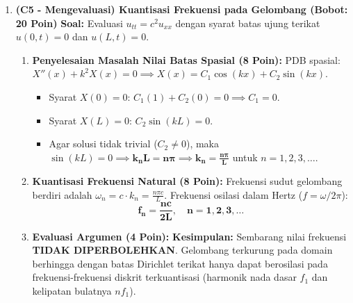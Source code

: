 \documentclass[11pt,a4paper]{article}
\begin{document}
\begin{enumerate}[label=\textbf{Soal \arabic*.}]
    \item \textbf{(C5 - Mengevaluasi) Kuantisasi Frekuensi pada Gelombang (Bobot: 20 Poin)}
    \textbf{Soal:} Evaluasi $u_{tt} = c^2 u_{xx}$ dengan syarat batas ujung terikat $u(0,t)=0$ dan $u(L,t)=0$.
    \begin{tcolorbox}[colback=green!5!white,colframe=green!60!black,title=Solusi Model:]
    \begin{enumerate}
        \item \textbf{Penyelesaian Masalah Nilai Batas Spasial (8 Poin):}
        PDB spasial: $X''(x) + k^2 X(x) = 0 \implies X(x) = C_1 \cos(kx) + C_2 \sin(kx)$.
        \begin{itemize}
            \item Syarat $X(0) = 0$: $C_1(1) + C_2(0) = 0 \implies C_1 = 0$.
            \item Syarat $X(L) = 0$: $C_2 \sin(k L) = 0$.
            \item Agar solusi tidak trivial ($C_2 \ne 0$), maka $\sin(k L) = 0 \implies \mathbf{k_n L = n\pi} \implies \mathbf{k_n = \frac{n\pi}{L}}$ untuk $n = 1, 2, 3, \dots$.
        \end{itemize}
        \item \textbf{Kuantisasi Frekuensi Natural (8 Poin):}
        Frekuensi sudut gelombang berdiri adalah $\omega_n = c \cdot k_n = \frac{n\pi c}{L}$.
        Frekuensi osilasi dalam Hertz ($f = \omega / 2\pi$):
        $$ \mathbf{f_n = \frac{n c}{2L}, \quad n = 1, 2, 3, \dots} $$
        \item \textbf{Evaluasi Argumen (4 Poin):}
        \textbf{Kesimpulan:} Sembarang nilai frekuensi \textbf{TIDAK DIPERBOLEHKAN}. Gelombang terkurung pada domain berhingga dengan batas Dirichlet terikat hanya dapat berosilasi pada frekuensi-frekuensi diskrit terkuantisasi (harmonik nada dasar $f_1$ dan kelipatan bulatnya $n f_1$).
    \end{enumerate}
    \end{tcolorbox}


\end{enumerate}
\end{document}
